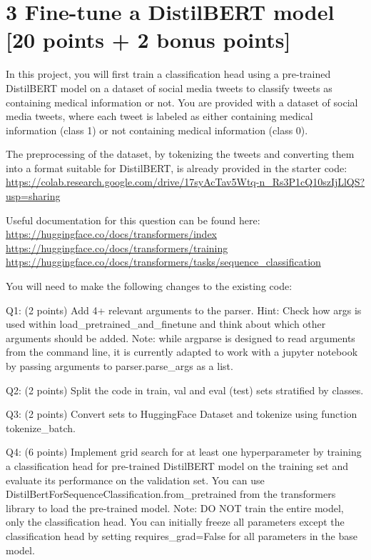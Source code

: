 \documentclass[
  letterpaper,
  DIV=11,
  numbers=noendperiod]{scrartcl}
\begin{document}
\section{3 Fine-tune a DistilBERT model {[}20 points + 2 bonus
points{]}}\label{fine-tune-a-distilbert-model-20-points-2-bonus-points}

In this project, you will first train a classification head using a
pre-trained DistilBERT model on a dataset of social media tweets to
classify tweets as containing medical information or not. You are
provided with a dataset of social media tweets, where each tweet is
labeled as either containing medical information (class 1) or not
containing medical information (class 0).

The preprocessing of the dataset, by tokenizing the tweets and
converting them into a format suitable for DistilBERT, is already
provided in the starter code:
\url{https://colab.research.google.com/drive/17syAcTav5Wtq-n_Rs3P1cQ10szIjLlQS?usp=sharing}

Useful documentation for this question can be found here:
\url{https://huggingface.co/docs/transformers/index}
\url{https://huggingface.co/docs/transformers/training}
\url{https://huggingface.co/docs/transformers/tasks/sequence_classification}

You will need to make the following changes to the existing code:

Q1: (2 points) Add 4+ relevant arguments to the parser. Hint: Check how
args is used within load\_pretrained\_and\_finetune and think about
which other arguments should be added. Note: while argparse is designed
to read arguments from the command line, it is currently adapted to work
with a jupyter notebook by passing arguments to parser.parse\_args as a
list.

Q2: (2 points) Split the code in train, val and eval (test) sets
stratified by classes.

Q3: (2 points) Convert sets to HuggingFace Dataset and tokenize using
function tokenize\_batch.

Q4: (6 points) Implement grid search for at least one hyperparameter by
training a classification head for pre-trained DistilBERT model on the
training set and evaluate its performance on the validation set. You can
use DistilBertForSequenceClassification.from\_pretrained from the
transformers library to load the pre-trained model. Note: DO NOT train
the entire model, only the classification head. You can initially freeze
all parameters except the classification head by setting
requires\_grad=False for all parameters in the base model.
\end{document}
